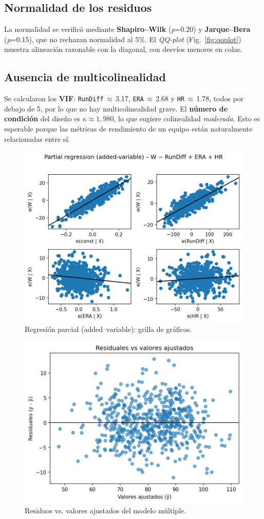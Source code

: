 \documentclass[man,floatsintext]{apa7}
\begin{document}
\subsection{Normalidad de los residuos}
La normalidad se verificó mediante \textbf{Shapiro--Wilk} (\emph{p}=0.20) y \textbf{Jarque--Bera} (\emph{p}=0.15), que no rechazan normalidad al 5\%. El \emph{QQ-plot} (Fig.~\ref{fig:qqplot}) muestra alineación razonable con la diagonal, con desvíos menores en colas.

\subsection{Ausencia de multicolinealidad}
Se calcularon los \textbf{VIF}: \texttt{RunDiff}\,$\approx$\,3.17, \texttt{ERA}\,$\approx$\,2.68 y \texttt{HR}\,$\approx$\,1.78, todos por debajo de 5, por lo que no hay multicolinealidad grave. El \textbf{número de condición} del diseño es \(\kappa\approx1{,}980\), lo que sugiere colinealidad \emph{moderada}. Esto es esperable porque las métricas de rendimiento de un equipo están naturalmente relacionadas entre sí.

\begin{figure}[H]
    \centering
    \includegraphics[width=.85\linewidth]{../plots/final_version/ols_partial_regression_grid.png}
    \caption{Regresión parcial (added--variable): grilla de gráficos.}
    \label{fig:partreg}
\end{figure}

\begin{figure}[H]
    \centering
    \includegraphics[width=.65\linewidth]{../plots/final_version/ols_residuals_vs_fitted.png}
    \caption{Residuos vs. valores ajustados del modelo múltiple.}
    \label{fig:resid_fitted}
\end{figure}
\end{document}
